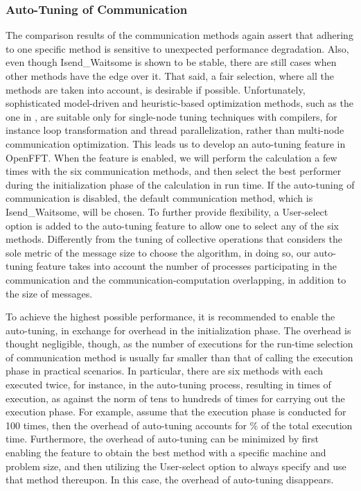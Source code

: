 \subsubsection{Auto-Tuning of Communication}

The comparison results of the communication methods again assert that adhering to one specific method is sensitive to unexpected performance degradation. Also, even though Isend\_Waitsome is shown to be stable, there are still cases when other methods have the edge over it. That said, a fair selection, where all the methods are taken into account, is desirable if possible. Unfortunately, sophisticated model-driven and heuristic-based optimization methods, such as the one in  \cite{Pouchet:2010:CIM:1884643.1884672}, are suitable only for single-node tuning techniques with compilers, for instance loop transformation and thread parallelization, rather than multi-node communication optimization. This leads us to develop an auto-tuning feature in OpenFFT. 
When the feature is enabled, we will perform the calculation a few times with the six communication methods, and then select the best performer during the initialization phase of the calculation in run time. If the auto-tuning of communication is disabled, the default communication method, which is Isend\_Waitsome, will be chosen. To further provide flexibility, a User-select option is added to the auto-tuning feature to allow one to select any of the six methods. Differently from the tuning of collective operations \cite{Thakur03improvingthe} that considers the sole metric of the message size to choose the algorithm, in doing so, our auto-tuning feature takes into account the number of processes participating in the communication and the communication-computation overlapping, in addition to the size of messages.   

To achieve the highest possible performance, it is recommended to enable the auto-tuning, in exchange for overhead in the initialization phase. The overhead is thought negligible, though, as the number of executions for the run-time selection of communication method is usually far smaller than that of calling the execution phase in practical scenarios. In particular, there are six methods with each executed twice, for instance, in the auto-tuning process, resulting in  times of execution, as against the norm of tens to hundreds of times for carrying out the execution phase. For example, assume that the execution phase is conducted for 100 times, then the overhead of auto-tuning accounts for \% of the total execution time. Furthermore, the overhead of auto-tuning can be minimized by first enabling the feature to obtain the best method with a specific machine and problem size, and then utilizing the User-select option to always specify and use that method thereupon. In this case, the overhead of auto-tuning disappears. 

